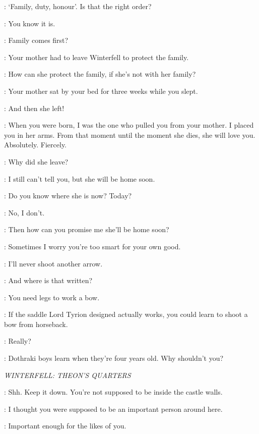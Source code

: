\BRAN: `Family, duty, honour'.  Is that the right order? 

\LUWIN: You know it is. 

\BRAN: Family comes first? 

\LUWIN: Your mother had to leave Winterfell to protect the family. 

\BRAN: How can she protect the family, if she's not with her family? 

\LUWIN: Your mother sat by your bed for three weeks while you slept. 

\BRAN: And then she left! 

\LUWIN: When you were born, I was the one who pulled you from your mother. I placed you in her arms. From that moment until the moment she dies, she will love you. Absolutely. Fiercely. 

\BRAN: Why did she leave? 

\LUWIN: I still can't tell you, but she will be home soon. 

\BRAN: Do you know where she is now? Today? 

\LUWIN: No, I don't. 

\BRAN: Then how can you promise me she'll be home soon? 

\LUWIN: Sometimes I worry you're too smart for your own good. 

\BRAN: I'll never shoot another arrow. 

\LUWIN: And where is that written? 

\BRAN: You need legs to work a bow. 

\LUWIN: If the saddle Lord Tyrion designed actually works, you could learn to shoot a bow from horseback. 

\BRAN: Really? 

\LUWIN: Dothraki boys learn when they're four years old. Why shouldn't you? 

\scene

\textit{WINTERFELL: THEON'S QUARTERS} 


\THEON: Shh. Keep it down. You're not supposed to be inside the castle walls. 


\ROS: I thought you were supposed to be an important person around here. 

\THEON: Important enough for the likes of you. 

